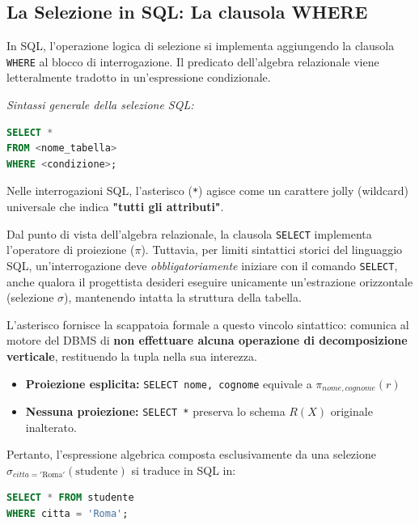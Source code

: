 \subsection{La Selezione in SQL: La clausola WHERE}

In SQL, l'operazione logica di selezione si implementa aggiungendo la clausola \texttt{WHERE} al blocco di interrogazione. Il predicato dell'algebra relazionale viene letteralmente tradotto in un'espressione condizionale.

\textit{Sintassi generale della selezione SQL:}
\begin{lstlisting}[language=SQL, basicstyle=\ttfamily\small, keywordstyle=\color{blue}\bfseries]
SELECT *
FROM <nome_tabella>
WHERE <condizione>;
\end{lstlisting}

Nelle interrogazioni SQL, l'asterisco (\texttt{*}) agisce come un carattere jolly (wildcard) universale che indica \textbf{"tutti gli attributi"}. 

Dal punto di vista dell'algebra relazionale, la clausola \texttt{SELECT} implementa l'operatore di proiezione ($\pi$). Tuttavia, per limiti sintattici storici del linguaggio SQL, un'interrogazione deve \textit{obbligatoriamente} iniziare con il comando \texttt{SELECT}, anche qualora il progettista desideri eseguire unicamente un'estrazione orizzontale (selezione $\sigma$), mantenendo intatta la struttura della tabella.

L'asterisco fornisce la scappatoia formale a questo vincolo sintattico: comunica al motore del DBMS di \textbf{non effettuare alcuna operazione di decomposizione verticale}, restituendo la tupla nella sua interezza.

\begin{itemize}
    \item \textbf{Proiezione esplicita:} \texttt{SELECT nome, cognome} equivale a $\pi_{nome, cognome}(r)$
    \item \textbf{Nessuna proiezione:} \texttt{SELECT *} preserva lo schema $R(X)$ originale inalterato.
\end{itemize}

Pertanto, l'espressione algebrica composta esclusivamente da una selezione \\ $\sigma_{citta = '\text{Roma}'}(\text{studente})$ si traduce in SQL in:
\begin{lstlisting}[language=SQL, basicstyle=\ttfamily\small, keywordstyle=\color{blue}\bfseries]
SELECT * FROM studente 
WHERE citta = 'Roma';
\end{lstlisting}

